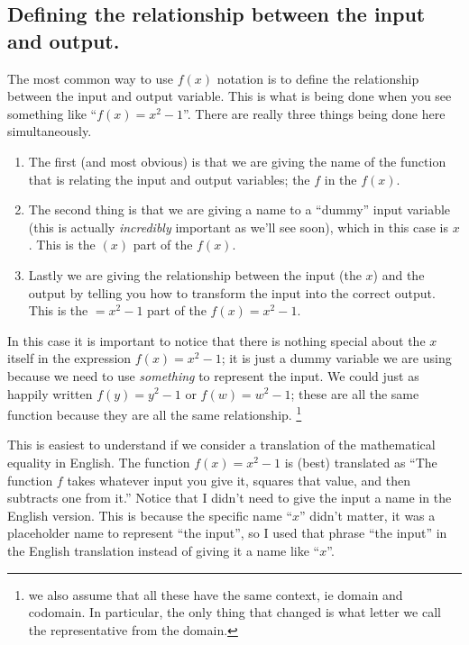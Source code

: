 \documentclass{ximeraXloud}
\begin{document}
    \subsection*{Defining the relationship between the input and output.}
        The most common way to use $f(x)$ notation is to define the relationship between the input and output variable. This is what is being done when you see something like ``$f(x) = x^2 - 1$''. There are really three things being done here simultaneously. 
        \begin{enumerate}[label=\alph*)]
            \item The first (and most obvious) is that we are giving the name of the function that is relating the input and output variables; the $f$ in the $f(x)$. 
            \item The second thing is that we are giving a name to a ``dummy'' input variable (this is actually \textit{incredibly} important as we'll see soon), which in this case is $x$. This is the $(x)$ part of the $f(x)$.
            \item Lastly we are giving the relationship between the input (the $x$) and the output by telling you how to transform the input into the correct output. This is the $= x^2 - 1$ part of the $f(x) = x^2 - 1$. 
        \end{enumerate}
        In this case it is important to notice that there is nothing special about the $x$ itself in the expression $f(x) = x^2 - 1$; it is just a dummy variable we are using because we need to use \textit{something} to represent the input. We could just as happily written $f(y) = y^2 - 1$ or $f(w) = w^2 - 1$; these are all the same function because they are all the same relationship.%
        \footnote{we also assume that all these have the same context, ie domain and codomain. In particular, the only thing that changed is what letter we call the representative from the domain.}%
        
        This is easiest to understand if we consider a translation of the mathematical equality in English. The function $f(x) = x^2 - 1$ is (best) translated as ``The function $f$ takes whatever input you give it, squares that value, and then subtracts one from it.'' Notice that I didn't need to give the input a name in the English version. This is because the specific name ``$x$'' didn't matter, it was a placeholder name to represent ``the input'', so I used that phrase ``the input'' in the English translation instead of giving it a name like ``$x$''.
        
\end{document}

